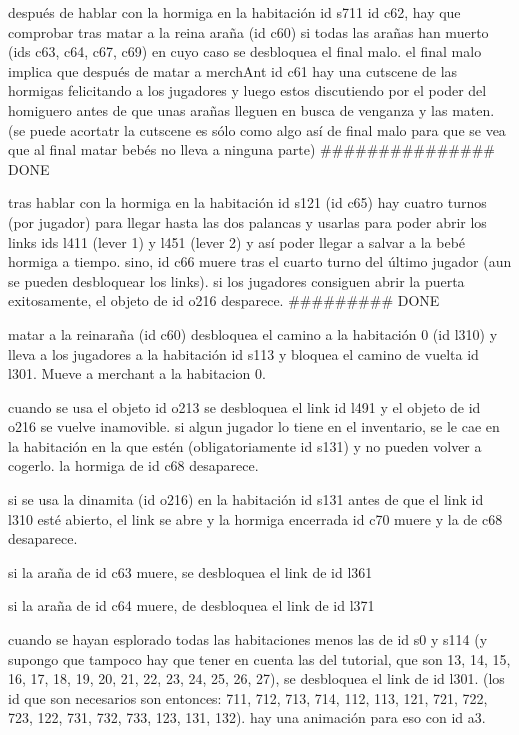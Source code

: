 \begin{DoxyItemize}
\item después de hablar con la hormiga en la habitación id s711 id c62, hay que comprobar tras matar a la reina araña (id c60) si todas las arañas han muerto (ids c63, c64, c67, c69) en cuyo caso se desbloquea el final malo. el final malo implica que después de matar a merch\+Ant id c61 hay una cutscene de las hormigas felicitando a los jugadores y luego estos discutiendo por el poder del homiguero antes de que unas arañas lleguen en busca de venganza y las maten. (se puede acortatr la cutscene es sólo como algo así de final malo para que se vea que al final matar bebés no lleva a ninguna parte) \#\#\#\#\#\#\#\#\#\#\#\#\#\#\# DONE
\item tras hablar con la hormiga en la habitación id s121 (id c65) hay cuatro turnos (por jugador) para llegar hasta las dos palancas y usarlas para poder abrir los links ids l411 (lever 1) y l451 (lever 2) y así poder llegar a salvar a la bebé hormiga a tiempo. sino, id c66 muere tras el cuarto turno del último jugador (aun se pueden desbloquear los links). si los jugadores consiguen abrir la puerta exitosamente, el objeto de id o216 desparece. \#\#\#\#\#\#\#\#\# DONE
\item matar a la reinaraña (id c60) desbloquea el camino a la habitación 0 (id l310) y lleva a los jugadores a la habitación id s113 y bloquea el camino de vuelta id l301. Mueve a merchant a la habitacion 0.
\item cuando se usa el objeto id o213 se desbloquea el link id l491 y el objeto de id o216 se vuelve inamovible. si algun jugador lo tiene en el inventario, se le cae en la habitación en la que estén (obligatoriamente id s131) y no pueden volver a cogerlo. la hormiga de id c68 desaparece.
\item si se usa la dinamita (id o216) en la habitación id s131 antes de que el link id l310 esté abierto, el link se abre y la hormiga encerrada id c70 muere y la de c68 desaparece.
\item si la araña de id c63 muere, se desbloquea el link de id l361
\item si la araña de id c64 muere, de desbloquea el link de id l371
\item cuando se hayan esplorado todas las habitaciones menos las de id s0 y s114 (y supongo que tampoco hay que tener en cuenta las del tutorial, que son 13, 14, 15, 16, 17, 18, 19, 20, 21, 22, 23, 24, 25, 26, 27), se desbloquea el link de id l301. (los id que son necesarios son entonces\+: 711, 712, 713, 714, 112, 113, 121, 721, 722, 723, 122, 731, 732, 733, 123, 131, 132). hay una animación para eso con id a3.

\end{DoxyItemize}
